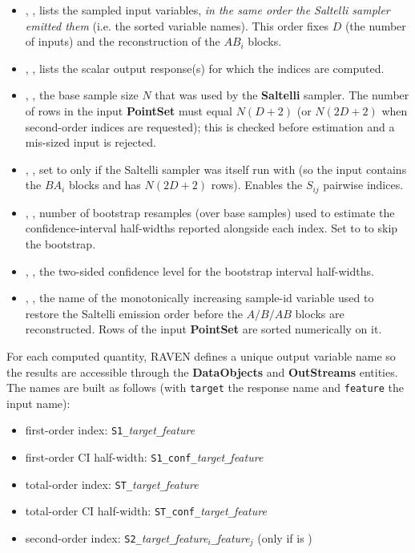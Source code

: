 \begin{itemize}
  \item {}, ,
    lists the sampled input variables, \emph{in the same order the Saltelli
    sampler emitted them} (i.e. the sorted variable names). This order fixes
    $D$ (the number of inputs) and the reconstruction of the $AB_i$ blocks.
  \item {}, ,
    lists the scalar output response(s) for which the indices are computed.
  \item {}, , the base sample size $N$
    that was used by the \textbf{Saltelli} sampler. The number of rows in the
    input \textbf{PointSet} must equal $N(D+2)$ (or $N(2D+2)$ when second-order
    indices are requested); this is checked before estimation and a mis-sized
    input is rejected.
  \item {}, , set to
     only if the Saltelli sampler was itself run with
      (so the input contains the
    $BA_i$ blocks and has $N(2D+2)$ rows). Enables the $S_{ij}$ pairwise
    indices. 
  \item {}, , number of
    bootstrap resamples (over base samples) used to estimate the
    confidence-interval half-widths reported alongside each index. Set to
     to skip the bootstrap. 
  \item {}, , the
    two-sided confidence level for the bootstrap interval half-widths.
  \item {}, , the name of the
    monotonically increasing sample-id variable used to restore the Saltelli
    emission order before the $A / B / AB$ blocks are reconstructed. Rows of the
    input \textbf{PointSet} are sorted numerically on it. 
\end{itemize}
%
\nb For each computed quantity, RAVEN defines a unique output variable name so
the results are accessible through the \textbf{DataObjects} and
\textbf{OutStreams} entities. The names are built as follows (with
\texttt{target} the response name and \texttt{feature} the input name):
\begin{itemize}
  \item first-order index: \texttt{S1\_}\emph{target}\texttt{\_}\emph{feature}
  \item first-order CI half-width: \texttt{S1\_conf\_}\emph{target}\texttt{\_}\emph{feature}
  \item total-order index: \texttt{ST\_}\emph{target}\texttt{\_}\emph{feature}
  \item total-order CI half-width: \texttt{ST\_conf\_}\emph{target}\texttt{\_}\emph{feature}
  \item second-order index: \texttt{S2\_}\emph{target}\texttt{\_}\emph{feature$_i$}\texttt{\_}\emph{feature$_j$} (only if  is )
\end{itemize}
